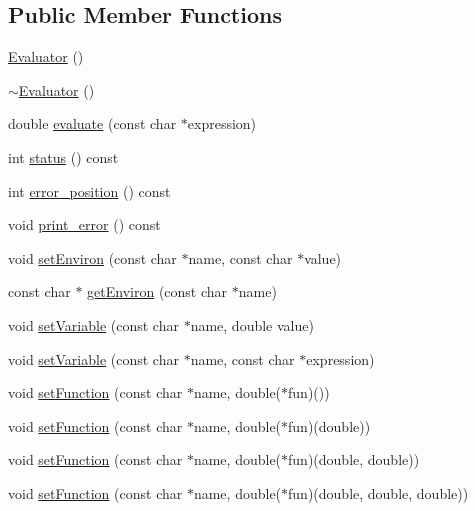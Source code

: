 \subsection*{Public Member Functions}
\begin{DoxyCompactItemize}
\item 
\hyperlink{class_xml_tools_1_1_evaluator_adcce935da40868c8e9ee41a6cd7da30c}{Evaluator} ()
\item 
\hyperlink{class_xml_tools_1_1_evaluator_acf06d5359f233c9e5c5d9127eb065f25}{$\sim$Evaluator} ()
\item 
double \hyperlink{class_xml_tools_1_1_evaluator_a602611e00d06e6fa2b8c5a1b292c2747}{evaluate} (const char $\ast$expression)
\item 
int \hyperlink{class_xml_tools_1_1_evaluator_a2bb48b05d692c7b2f32d7ef8996ef835}{status} () const 
\item 
int \hyperlink{class_xml_tools_1_1_evaluator_af036858d3fe40671448306c572e0fd8f}{error\_\-position} () const 
\item 
void \hyperlink{class_xml_tools_1_1_evaluator_ad034901d9b832062c7413e698031214e}{print\_\-error} () const 
\item 
void \hyperlink{class_xml_tools_1_1_evaluator_a3329d0bef31237642ed7d5ca53d9d167}{setEnviron} (const char $\ast$name, const char $\ast$value)
\item 
const char $\ast$ \hyperlink{class_xml_tools_1_1_evaluator_a3b19ba699533cdb3517c3929f9c479ae}{getEnviron} (const char $\ast$name)
\item 
void \hyperlink{class_xml_tools_1_1_evaluator_a46b7fb4c5d1366cfa70a0b1faf1a8234}{setVariable} (const char $\ast$name, double value)
\item 
void \hyperlink{class_xml_tools_1_1_evaluator_aa585fa26afb0fbf64b60f9758a7de5f0}{setVariable} (const char $\ast$name, const char $\ast$expression)
\item 
void \hyperlink{class_xml_tools_1_1_evaluator_a54a432d7beccf23e2bebda5e449fffe0}{setFunction} (const char $\ast$name, double($\ast$fun)())
\item 
void \hyperlink{class_xml_tools_1_1_evaluator_a2183927ba22512c28f9933439d88d6c7}{setFunction} (const char $\ast$name, double($\ast$fun)(double))
\item 
void \hyperlink{class_xml_tools_1_1_evaluator_a831f5dc1635829ad2b09e79ada885771}{setFunction} (const char $\ast$name, double($\ast$fun)(double, double))
\item 
void \hyperlink{class_xml_tools_1_1_evaluator_a40b7b86078c23765a6ab09636fece140}{setFunction} (const char $\ast$name, double($\ast$fun)(double, double, double))

\end{DoxyCompactItemize}
